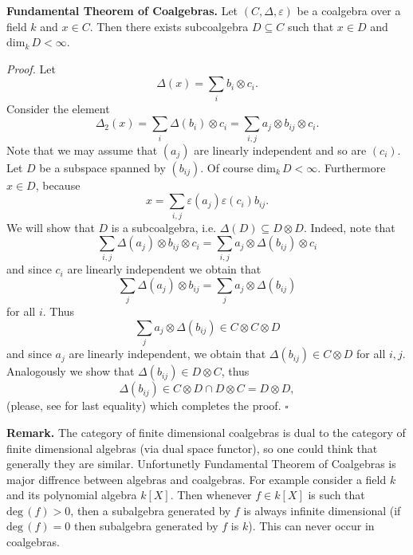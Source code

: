 \documentclass[12pt]{article}
\begin{document}
\textbf{Fundamental Theorem of Coalgebras.} Let $(C,\Delta,\varepsilon)$ be a coalgebra over a field $k$ and $x\in C$. Then there exists subcoalgebra $D\subseteq C$ such that $x\in D$ and $\mathrm{dim}_{k}\,D<\infty$.

\textit{Proof.} Let $$\Delta(x)=\sum_{i} b_i\otimes c_i.$$ Consider the element $$\Delta_2(x)=\sum_{i} \Delta(b_i)\otimes c_i = \sum_{i,j} a_j\otimes b_{ij}\otimes c_i.$$ Note that we may assume that $(a_j)$ are linearly independent and so are $(c_i)$. Let $D$ be a subspace spanned by $(b_{ij})$. Of course $\mathrm{dim}_{k}\,D<\infty$. Furthermore $x\in D$, because $$x=\sum_{i,j} \varepsilon(a_j)\varepsilon(c_i)b_{ij}.$$ We will show that $D$ is a subcoalgebra, i.e. $\Delta(D)\subseteq D\otimes D$. Indeed, note that $$\sum_{i,j} \Delta(a_j)\otimes b_{ij}\otimes c_i=\sum_{i,j} a_j\otimes \Delta(b_{ij})\otimes c_i$$ and since $c_i$ are linearly independent we obtain that $$\sum_{j} \Delta(a_j)\otimes b_{ij}=\sum_{j} a_j\otimes \Delta(b_{ij})$$ for all $i$. Thus $$\sum_{j} a_j\otimes \Delta(b_{ij})\in C\otimes C\otimes D$$ and since $a_j$ are linearly independent, we obtain that $\Delta(b_{ij})\in C\otimes D$ for all $i,j$. Analogously we show that $\Delta(b_{ij})\in D\otimes C$, thus $$\Delta(b_{ij})\in C\otimes D\cap D\otimes C= D\otimes D,$$ (please, see  for last equality) which completes the proof. $\square$

\textbf{Remark.} The category of finite dimensional coalgebras is dual to the category of finite dimensional algebras (via dual space functor), so one could think that generally they are similar. Unfortunetly Fundamental Theorem of Coalgebras is major diffrence between algebras and coalgebras. For example consider a field $k$ and its polynomial algebra $k[X]$. Then whenever $f\in k[X]$ is such that $\mathrm{deg}\,(f)>0$, then a subalgebra generated by $f$ is always infinite dimensional (if $\mathrm{deg}\,(f)=0$ then subalgebra generated by $f$ is $k$). This can never occur in coalgebras.
\end{document}
